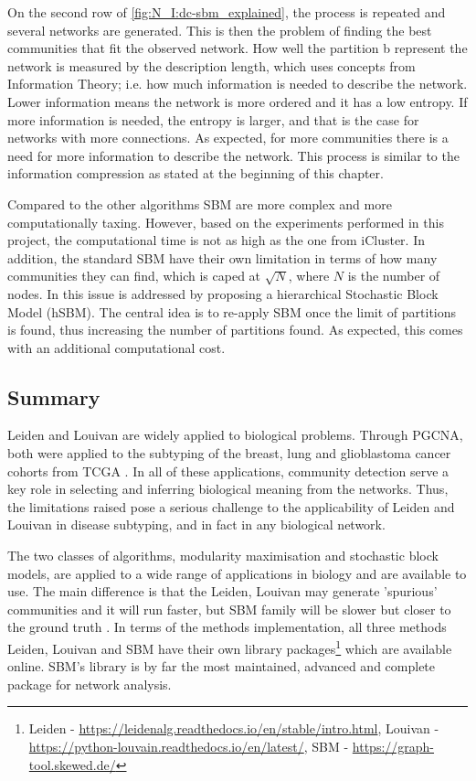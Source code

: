 On the second row of \cref{fig:N_I:dc-sbm_explained}, the process is repeated and several networks are generated. This is then the problem of finding the best communities that fit the observed network. How well the partition b represent the network is measured by the description length, which uses concepts from Information Theory; i.e. how much information is needed to describe the network. Lower information means the network is more ordered and it has a low entropy. If more information is needed, the entropy is larger, and that is the case for networks with more connections. As expected, for more communities there is a need for more information to describe the network. This process is similar to the information compression as stated at the beginning of this chapter.

Compared to the other algorithms SBM are more complex and more computationally taxing. However, based on the experiments performed in this project, the computational time is not as high as the one from iCluster\citet{Mo2013-zi}. In addition, the standard SBM \citet{Peixoto2019-fg, Peixoto2017-gc, Peixoto2017-ua, Karrer2011-si} have their own limitation in terms of how many communities they can find, which is caped at $\sqrt{N}$, where $N$ is the number of nodes. In \citet{Peixoto2014-yb} this issue is addressed by proposing a hierarchical Stochastic Block Model (hSBM). The central idea is to re-apply SBM once the limit of partitions is found, thus increasing the number of partitions found. As expected, this comes with an additional computational cost.

\subsection{Summary}


Leiden and Louivan are widely applied to biological problems. Through PGCNA, both were applied to the subtyping of the breast, lung and glioblastoma cancer cohorts from TCGA \cite{Tanner2023-wa, Care2019-ij}. In all of these applications, community detection serve a key role in selecting and inferring biological meaning from the networks. Thus, the limitations raised \citet{Peixoto2021-jx,Guimera2004-gv, Peixoto2023-rt} pose a serious challenge to the applicability of Leiden and Louivan in disease subtyping, and in fact in any biological network. 

The two classes of algorithms, modularity maximisation and stochastic block models, are applied to a wide range of applications in biology and are available to use. The main difference is that the Leiden, Louivan may generate 'spurious' communities and it will run faster, but SBM family will be slower but closer to the ground truth \citet{Peixoto2023-mw}. In terms of the methods implementation, all three methods Leiden, Louivan and SBM have their own library packages\footnote{Leiden - \url{https://leidenalg.readthedocs.io/en/stable/intro.html}, Louivan - \url{https://python-louvain.readthedocs.io/en/latest/}, SBM - \url{https://graph-tool.skewed.de/}} which are available online. 
SBM's library is by far the most maintained, advanced and complete package for network analysis.






